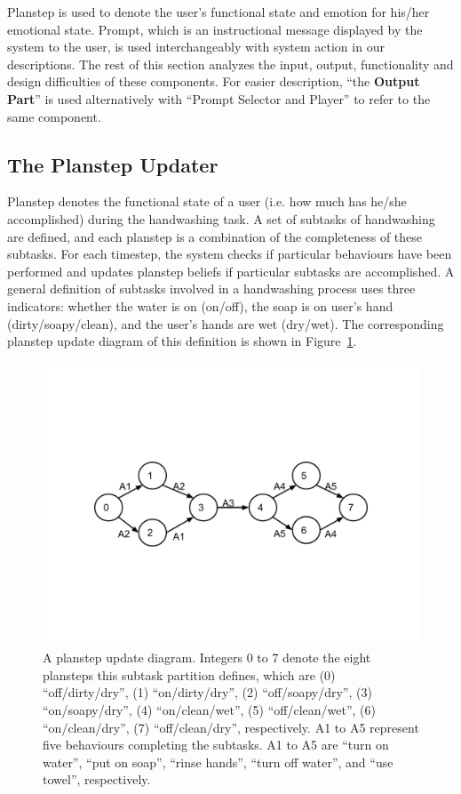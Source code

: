 Planstep is used to denote the user's functional state and emotion for his/her emotional state. Prompt, which is an instructional message displayed by the system to the user, is used interchangeably with system action in our descriptions. The rest of this section analyzes the input, output, functionality and design difficulties of these components. For easier description, ``the \textbf{Output Part}'' is used alternatively with ``Prompt Selector and Player'' to refer to the same component.

\subsection{The Planstep Updater}

Planstep denotes the functional state of a user (i.e. how much has he/she accomplished) during the handwashing task. A set of subtasks of handwashing are defined, and each planstep is a combination of the completeness of these subtasks. For each timestep, the system checks if particular behaviours have been performed and updates planstep beliefs if particular subtasks are accomplished. A general definition of subtasks involved in a handwashing process uses three indicators: whether the water is on (on/off), the soap is on user's hand (dirty/soapy/clean), and the user's hands are wet (dry/wet). The corresponding planstep update diagram of this definition is shown in Figure~\ref{fig:planstep}.

\begin{figure}[p]
\centering
\includegraphics[width=\linewidth]{fig-planstep.pdf}
\caption{A planstep update diagram. Integers 0 to 7 denote the eight plansteps this subtask partition defines, which are (0) ``off/dirty/dry'', (1) ``on/dirty/dry'', (2) ``off/soapy/dry'', (3) ``on/soapy/dry'', (4) ``on/clean/wet'', (5) ``off/clean/wet'', (6) ``on/clean/dry'', (7) ``off/clean/dry'', respectively. A1 to A5 represent five behaviours completing the subtasks. A1 to A5 are ``turn on water'', ``put on soap'', ``rinse hands'', ``turn off water'', and ``use towel'', respectively.}
\label{fig:planstep}
\end{figure}

